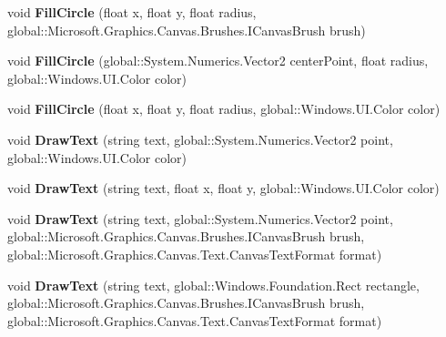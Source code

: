 \begin{DoxyCompactItemize}
void {\bfseries Fill\+Circle} (float x, float y, float radius, global\+::\+Microsoft.\+Graphics.\+Canvas.\+Brushes.\+I\+Canvas\+Brush brush)
\item 
\mbox{\label{class_microsoft_1_1_graphics_1_1_canvas_1_1_canvas_drawing_session_a4ba02fb1533d2fc66a256224d977ef80}} 
void {\bfseries Fill\+Circle} (global\+::\+System.\+Numerics.\+Vector2 center\+Point, float radius, global\+::\+Windows.\+U\+I.\+Color color)
\item 
\mbox{\label{class_microsoft_1_1_graphics_1_1_canvas_1_1_canvas_drawing_session_a591dd64dd2156135701928d1169760e7}} 
void {\bfseries Fill\+Circle} (float x, float y, float radius, global\+::\+Windows.\+U\+I.\+Color color)
\item 
\mbox{\label{class_microsoft_1_1_graphics_1_1_canvas_1_1_canvas_drawing_session_ab13254390f363d3c656f73182f5ac63a}} 
void {\bfseries Draw\+Text} (string text, global\+::\+System.\+Numerics.\+Vector2 point, global\+::\+Windows.\+U\+I.\+Color color)
\item 
\mbox{\label{class_microsoft_1_1_graphics_1_1_canvas_1_1_canvas_drawing_session_aad1b1d749b19261e264e8b4a65f81d21}} 
void {\bfseries Draw\+Text} (string text, float x, float y, global\+::\+Windows.\+U\+I.\+Color color)
\item 
\mbox{\label{class_microsoft_1_1_graphics_1_1_canvas_1_1_canvas_drawing_session_a9cd5d45cd381b77ac670c72b3a5f1843}} 
void {\bfseries Draw\+Text} (string text, global\+::\+System.\+Numerics.\+Vector2 point, global\+::\+Microsoft.\+Graphics.\+Canvas.\+Brushes.\+I\+Canvas\+Brush brush, global\+::\+Microsoft.\+Graphics.\+Canvas.\+Text.\+Canvas\+Text\+Format format)
\item 
\mbox{\label{class_microsoft_1_1_graphics_1_1_canvas_1_1_canvas_drawing_session_a23b5e737b4dd5b616b7ef69539e51805}} 
void {\bfseries Draw\+Text} (string text, global\+::\+Windows.\+Foundation.\+Rect rectangle, global\+::\+Microsoft.\+Graphics.\+Canvas.\+Brushes.\+I\+Canvas\+Brush brush, global\+::\+Microsoft.\+Graphics.\+Canvas.\+Text.\+Canvas\+Text\+Format format)

\end{DoxyCompactItemize}
